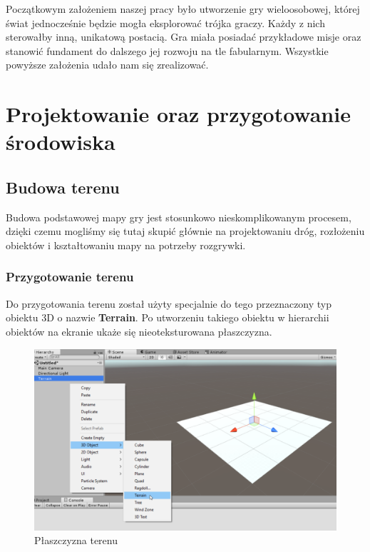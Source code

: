 \documentclass[openright]{xmgr}
\newcommand{\name}[1]{\textbf{\textcolor{NavyBlue}{#1}}}
\begin{document}
  Początkowym założeniem naszej pracy było utworzenie gry wieloosobowej, której świat jednocześnie będzie mogła eksplorować trójka graczy. Każdy z nich sterowałby inną, unikatową postacią. 
  Gra miała posiadać przykładowe misje oraz stanowić fundament do dalszego jej rozwoju na tle fabularnym. Wszystkie powyższe założenia udało nam się zrealizować. 

\chapter{Projektowanie oraz przygotowanie środowiska}
  \section{Budowa terenu}\label{sec:budowa_terenu}

    Budowa podstawowej mapy gry jest stosunkowo nieskomplikowanym procesem, dzięki czemu mogliśmy się tutaj skupić głównie na projektowaniu dróg, rozłożeniu obiektów i kształtowaniu mapy na potrzeby rozgrywki.

    \subsection{Przygotowanie terenu}

        Do przygotowania terenu został użyty specjalnie do tego przeznaczony typ obiektu 3D o nazwie \name{Terrain}. Po utworzeniu takiego obiektu w hierarchii obiektów na ekranie ukaże się nieoteksturowana płaszczyzna.

        \begin{figure}[H]
        \includegraphics[width=\textwidth]{teren_1.png}
        \caption{Płaszczyzna terenu}
        \end{figure}
\end{document}
